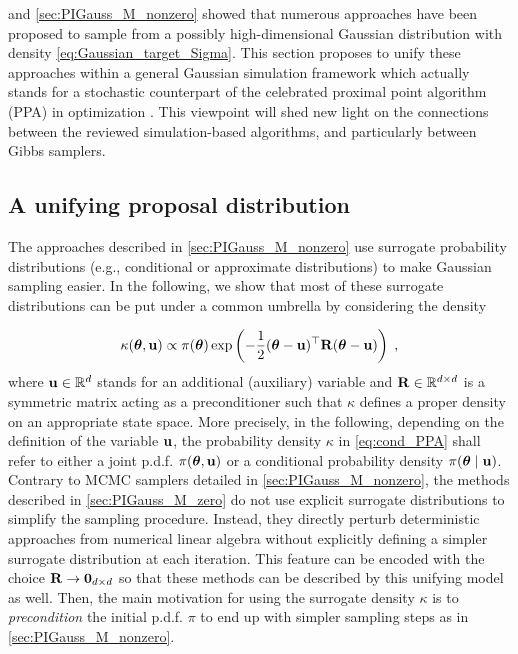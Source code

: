 \documentclass[nohypdvips,onefignum,onetabnum]{siamart171218}
\begin{document}
 and \cref{sec:PIGauss_M_nonzero} showed that numerous  approaches have been proposed to sample from a possibly high-dimensional Gaussian distribution with density  \cref{eq:Gaussian_target_Sigma}.
This section proposes to unify these approaches within a general Gaussian simulation framework which actually stands for a stochastic counterpart of the celebrated proximal point algorithm (PPA) in optimization \cite{Rockafellar1976}.
This viewpoint will shed new light on the connections between the reviewed simulation-based algorithms, and particularly between Gibbs samplers.

\subsection{A unifying proposal distribution}
\label{subsec:PIGauss}

The approaches described in \cref{sec:PIGauss_M_nonzero} use surrogate probability distributions (e.g., conditional or approximate distributions) to make Gaussian sampling easier.
%
In the following, we show that most of these surrogate distributions can be put under a common umbrella by considering the density

\begin{equation}
  \kappa(\Bs{\theta},\B{u}) \propto \pi(\Bs{\theta})\exp\pr{-\frac{1}{2}(\Bs{\theta}-\B{u})^{\top}\B{R}(\Bs{\theta}-\B{u})}\eqsp, \label{eq:cond_PPA}
\end{equation}
%
where $\mathbf{u} \in \mathbb{R}^d$ stands for an additional (auxiliary) variable and $\mathbf{R} \in \mathbb{R}^{d \times d}$ is a symmetric matrix acting as a preconditioner such that $\kappa$ defines a proper density on an appropriate state space.
More precisely, in the following, depending on the definition of the variable $\mathbf{u}$, the probability density $\kappa$ in \cref{eq:cond_PPA} shall refer to either a joint p.d.f. $\pi(\boldsymbol{\theta},\mathbf{u})$ or a conditional probability density $\pi(\boldsymbol{\theta}\mid\mathbf{u})$.
Contrary to MCMC samplers detailed in \cref{sec:PIGauss_M_nonzero}, the methods described in \cref{sec:PIGauss_M_zero} do not use explicit surrogate distributions to simplify the sampling procedure.
Instead, they directly perturb deterministic approaches from numerical linear algebra without explicitly defining a simpler surrogate distribution at each iteration.
This feature can be encoded with the choice $\mathbf{R} \rightarrow \mathbf{0}_{d \times d}$ so that these methods can be described by this  unifying model as well.
Then, the main motivation for using the surrogate density $\kappa$ is to \textit{precondition} the initial p.d.f. $\pi$ to end up with simpler sampling steps as in \cref{sec:PIGauss_M_nonzero}.
\end{document}

